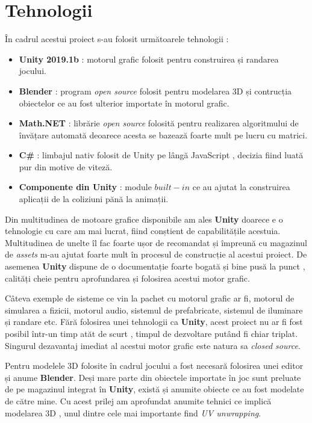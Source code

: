 \chapter{Tehnologii}

În cadrul acestui proiect s-au folosit următoarele tehnologii :
\begin{itemize}
\item \textbf{Unity 2019.1b} : motorul grafic folosit pentru construirea și randarea jocului.
\item \textbf{Blender} : program \textit{open source} folosit pentru modelarea 3D și contrucția obiectelor ce au fost ulterior importate în motorul grafic.
\item \textbf{Math.NET} : librărie \textit{open source} folosită pentru realizarea algoritmului de învățare automată deoarece acesta se bazează foarte mult pe lucru cu matrici.
\item \textbf{C\#} : limbajul nativ folosit de Unity pe lângă JavaScript , decizia fiind luată pur din motive de viteză.
\item \textbf{Componente din Unity} : module $built-in$ ce au ajutat la construirea aplicații de la coliziuni pănă la animații.
\end{itemize}

Din multitudinea de motoare grafice disponibile am ales \textbf{Unity} doarece e o tehnologie cu care am mai lucrat, fiind conștient de capabilitățile acestuia. Multitudinea de unelte îl fac foarte ușor de recomandat și împreună cu magazinul de \textit{assets} m-au ajutat foarte mult în procesul de construcție al acestui proiect. De asemenea \textbf{Unity} dispune de o documentație foarte bogată și bine pusă la punct , calități cheie pentru aprofundarea și folosirea acestui motor grafic.\par

Câteva exemple de sisteme ce vin la pachet cu motorul grafic ar fi, motorul de simularea a fizicii, motorul audio, sistemul de prefabricate, sistemul de iluminare și randare etc. Fără folosirea unei tehnologii ca \textbf{Unity}, acest proiect nu ar fi fost posibil într-un timp atăt de scurt , timpul de dezvoltare putând fi chiar triplat. Singurul dezavantaj imediat al acestui motor grafic este natura sa \textit{closed source}.\par

Pentru modelele 3D folosite în cadrul jocului a fost necesară folosirea unei editor și anume \textbf{Blender}. Deși mare parte din obiectele importate în joc sunt preluate de pe magazinul integrat în \textbf{Unity}, există și anumite obiecte ce au fost modelate de către mine. Cu acest prilej am aprofundat anumite tehnici ce implică modelarea 3D , unul dintre cele mai importante find \textit {UV unwrapping}.\par

